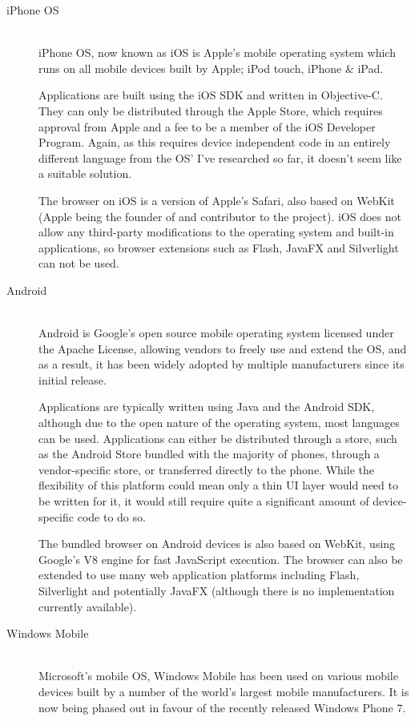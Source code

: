 \begin{description}
\item[iPhone OS] \hfill \\
iPhone OS\cite{ios:web}, now known as iOS is Apple's mobile operating system which runs on all mobile devices built by Apple; iPod touch, iPhone \& iPad. 

Applications are built using the iOS SDK and written in Objective-C. They can only be distributed through the Apple Store, which requires approval from Apple and a fee to be a member of the iOS Developer Program. Again, as this requires device independent code in an entirely different language from the OS' I've researched so far, it doesn't seem like a suitable solution.

The browser on iOS is a version of Apple's Safari, also based on WebKit (Apple being the founder of and contributor to the project). iOS does not allow any third-party modifications to the operating system and built-in applications, so browser extensions such as Flash, JavaFX and Silverlight can not be used.

\item[Android] \hfill \\
Android\cite{android:web} is Google's open source mobile operating system licensed under the Apache License, allowing vendors to freely use and extend the OS, and as a result, it has been widely adopted by multiple manufacturers since its initial release.

Applications are typically written using Java and the Android SDK, although due to the open nature of the operating system, most languages can be used. Applications can either be distributed through a store, such as the Android Store bundled with the majority of phones, through a vendor-specific store, or transferred directly to the phone. While the flexibility of this platform could mean only a thin UI layer would need to be written for it, it would still require quite a significant amount of device-specific code to do so.

The bundled browser on Android devices is also based on WebKit, using Google's V8 engine for fast JavaScript execution. The browser can also be extended to use many web application platforms including Flash, Silverlight and potentially JavaFX (although there is no implementation currently available).

\item[Windows Mobile] \hfill \\
Microsoft's mobile OS, Windows Mobile\cite{winmo:web} has been used on various mobile devices built by a number of the world's largest mobile manufacturers. It is now being phased out in favour of the recently released Windows Phone 7.


\end{description}
